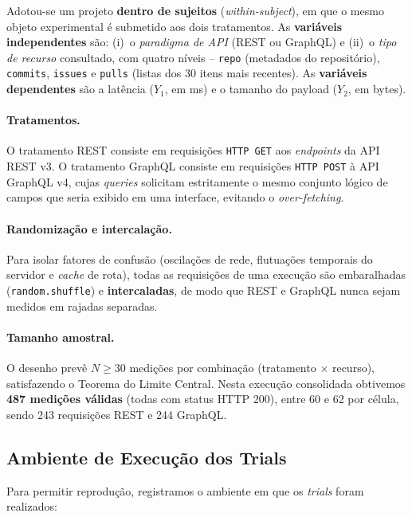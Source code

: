 \documentclass[10pt,a4paper,twocolumn]{article}
\begin{document}
Adotou-se um projeto \textbf{dentro de sujeitos} (\textit{within-subject}),
em que o mesmo objeto experimental é submetido aos dois tratamentos. As
\textbf{variáveis independentes} são: (i)~o \emph{paradigma de API}
(REST ou GraphQL) e (ii)~o \emph{tipo de recurso} consultado, com quatro
níveis -- \texttt{repo} (metadados do repositório), \texttt{commits},
\texttt{issues} e \texttt{pulls} (listas dos 30 itens mais recentes). As
\textbf{variáveis dependentes} são a latência ($Y_1$, em ms) e o tamanho do
payload ($Y_2$, em bytes).

\paragraph{Tratamentos.} O tratamento REST consiste em requisições
\texttt{HTTP GET} aos \textit{endpoints} da API REST v3. O tratamento GraphQL
consiste em requisições \texttt{HTTP POST} à API GraphQL v4, cujas
\textit{queries} solicitam estritamente o mesmo conjunto lógico de campos que
seria exibido em uma interface, evitando o \textit{over-fetching}.

\paragraph{Randomização e intercalação.} Para isolar fatores de confusão
(oscilações de rede, flutuações temporais do servidor e \textit{cache} de
rota), todas as requisições de uma execução são embaralhadas
(\texttt{random.shuffle}) e \textbf{intercaladas}, de modo que REST e GraphQL
nunca sejam medidos em rajadas separadas.

\paragraph{Tamanho amostral.} O desenho prevê $N \geq 30$ medições por
combinação (tratamento $\times$ recurso), satisfazendo o Teorema do Limite
Central. Nesta execução consolidada obtivemos \textbf{487 medições válidas}
(todas com status HTTP 200), entre 60 e 62 por célula, sendo 243 requisições
REST e 244 GraphQL.

\subsection{Ambiente de Execução dos Trials}

Para permitir reprodução, registramos o ambiente em que os \textit{trials}
foram realizados:
\end{document}
